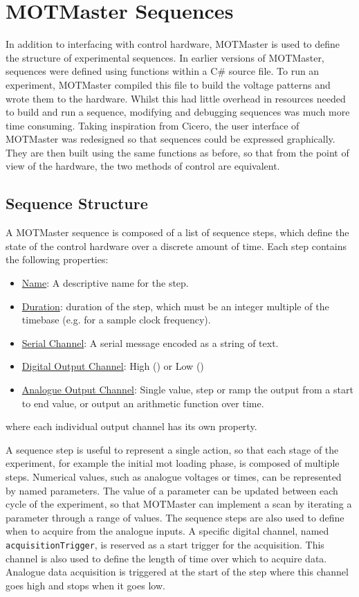 \section{MOTMaster Sequences}\label{sec:mm_sequences}
In addition to interfacing with control hardware, MOTMaster is used to define
the structure of experimental sequences. In earlier versions of MOTMaster,
sequences were defined using functions within a C\# source file. To run an
experiment, MOTMaster compiled this file to build the voltage patterns and
wrote them to the hardware. Whilst this had little overhead in resources
needed to build and run a sequence, modifying and debugging sequences was
much more time consuming. Taking inspiration from Cicero, the user interface
of MOTMaster was redesigned so that sequences could be expressed graphically.
They are then built using the same functions as before, so that from the
point of view of the hardware, the two methods of control are equivalent. 

\subsection{Sequence Structure}
A MOTMaster sequence is composed of a list of sequence steps, which define
the state of the control hardware over a discrete amount of time. Each step
contains the following properties:
\begin{itemize}
    \item \underline{Name}: A descriptive name for the step.
    \item \underline{Duration}: duration of the step, which must be an integer multiple of the timebase (e.g.  for a 
    sample clock frequency).
    \item \underline{Serial Channel}: A serial message encoded as a string of text.
    \item \underline{Digital Output Channel}: High () or Low ()
    \item \underline{Analogue Output Channel}: Single value, step or ramp the output from a start to end value, or output an arithmetic function over time.
\end{itemize}
where each individual output channel has its own property.
\par\noindent
A sequence step is useful to represent a single action, so that each
stage of the experiment, for example the initial \ac{mot} loading phase, is
composed of multiple steps. Numerical values, such as analogue voltages or
times, can be represented by named parameters. The value of a parameter can
be updated between each cycle of the experiment, so that MOTMaster can
implement a scan by iterating a parameter through a range of values. The sequence steps are also used to
define when to acquire from the analogue inputs. A specific digital channel,
named \verb|acquisitionTrigger|, is reserved as a start trigger for the
acquisition. This channel is also used to define the length of time over which to acquire data. Analogue data acquisition is triggered at the start of the step where this channel goes high and stops when it goes low. 
